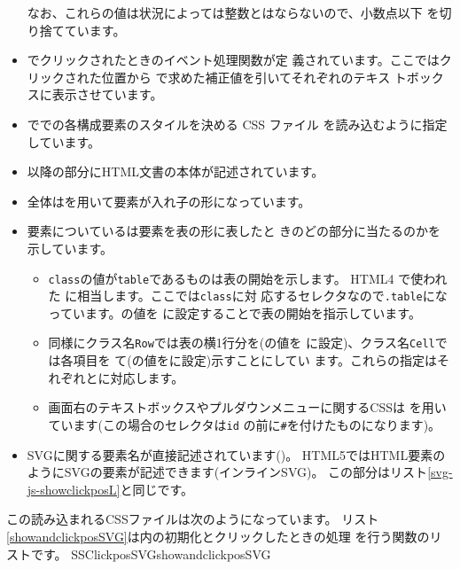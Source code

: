 \begin{itemize}
			 なお、これらの値は状況によっては整数とはならないので、小数点以下
			 を切り捨てています。
 \item {}でクリックされたときのイベント処理関数が定
       義されています。ここではクリックされた位置から
       で求めた補正値を引いてそれぞれのテキス
       トボックスに表示させています。
 \item {}で\HTML での各構成要素のスタイルを決める CSS ファイル
       を読み込むように指定しています。
 \item {}以降の部分にHTML文書の本体が記述されています。
 \item 全体はを用いて要素が入れ子の形になっています。
 \item {}要素についているは要素を表の形に表したと
       きのどの部分に当たるのかを示しています。
\begin{itemize}
 \item \texttt{class}の値が\texttt{table}であるものは表の開始を示します。
       HTML4 で使われた に相当します。ここでは\texttt{class}に対
       応する{セレクタ}なので\texttt{.table}になっています。の値を
       に設定することで表の開始を指示しています。
 \item 同様にクラス名\texttt{Row}では表の横1行分を(の値を
       に設定)、クラス名\texttt{Cell}では各項目を
       て(の値をに設定)示すことにしてい
       ます。これらの指定はそれぞれとに対応します。
 \item 画面右のテキストボックスやプルダウンメニューに関するCSSは
       を用いています(この場合の{セレクタ}は\texttt{id}
       の前に\texttt{\#}を付けたものになります)。
\end{itemize}
 \item SVGに関する要素名が直接記述されています()。
       HTML5ではHTML要素のようにSVGの要素が記述できます(インラインSVG)。
       この部分はリスト\ref{svg-js-showclickposL}と同じです。
\end{itemize}
この読み込まれるCSSファイルは次のようになっています。
\iffalse
リスト\ref{showandclickposSVG}は\SVG 内の初期化とクリックしたときの処理
を行う関数のリストです。
{SSClickposSVG}{showandclickposSVG}
